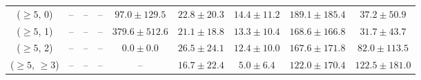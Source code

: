 \begin{table}[h!]
{\begin{tabular}{ccccccccc}
	($\ge5$, 0) & -- & -- & -- & $97.0\pm 129.5$ & $22.8\pm 20.3$ & $14.4\pm 11.2$ & $189.1\pm 185.4$ & $37.2\pm 50.9$ \\[0.5ex] 
	($\ge5$, 1) & -- & -- & -- & $379.6\pm 512.6$ & $21.1\pm 18.8$ & $13.3\pm 10.4$ & $168.6\pm 166.8$ & $31.7\pm 43.7$ \\[0.5ex] 
	($\ge5$, 2) & -- & -- & -- & $0.0\pm 0.0$ & $26.5\pm 24.1$ & $12.4\pm 10.0$ & $167.6\pm 171.8$ & $82.0\pm 113.5$ \\[0.5ex] 
	($\ge5$, $\ge3$) & -- & -- & -- & -- & $16.7\pm 22.4$ & $5.0\pm 6.4$ & $122.0\pm 170.4$ & $122.5\pm 181.0$ \\[0.5ex] 
	\hline
	\hline
\end{tabular}}
\end{table}
